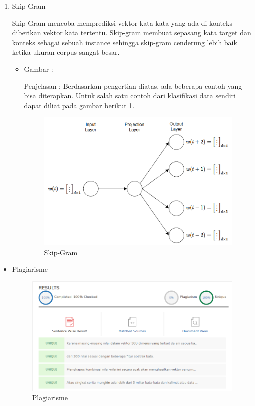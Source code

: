 \begin{enumerate}
\item Skip Gram
\par Skip-Gram mencoba memprediksi vektor kata-kata yang ada di konteks diberikan vektor kata tertentu. Skip-gram membuat sepasang kata target dan konteks sebagai sebuah instance sehingga skip-gram cenderung lebih baik ketika ukuran corpus sangat besar.
\par
\begin{itemize}
\item Gambar :
\par Penjelasan : Berdasarkan pengertian diatas, ada beberapa contoh yang bisa diterapkan. Untuk salah satu contoh dari klasifikasi data sendiri dapat diliat pada gambar berikut \ref{5_6}.
\begin{figure}[!hbtp]
\centering
\includegraphics[scale=0.5]{figures/zulfikar/5/5_5.png}
\caption{Skip-Gram}
\label{5_6}
\end{figure}
\end{itemize}
\end{enumerate}

\begin{itemize}
\item Plagiarisme
\begin{figure}[!hbtp]
\centering
\includegraphics[scale=0.5]{figures/zulfikar/5/5_6.png}
\caption{Plagiarisme}
\label{5_7}
\end{figure}
\end{itemize}


